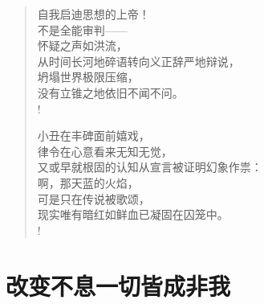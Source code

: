 \documentclass[UTF8, 12pt, a4paper]{ctexrep} %
\begin{document}
\begin{verse}
    自我启迪思想的上帝！\\
    不是全能审判——\\
    怀疑之声如洪流，\\
    从时间长河地碎语转向义正辞严地辩说，\\
    坍塌世界极限压缩，\\
    没有立锥之地依旧不闻不问。\\!

    小丑在丰碑面前嬉戏，\\
    律令在心意看来无知无觉，\\
    又或早就根固的认知从宣言被证明幻象作祟：\\
    啊，那天蓝的火焰，\\
    可是只在传说被歌颂，\\
    现实唯有暗红如鲜血已凝固在囚笼中。\\!

\end{verse}
\newpage

\section*{改变不息一切皆成非我}
\newpage
\end{document}
